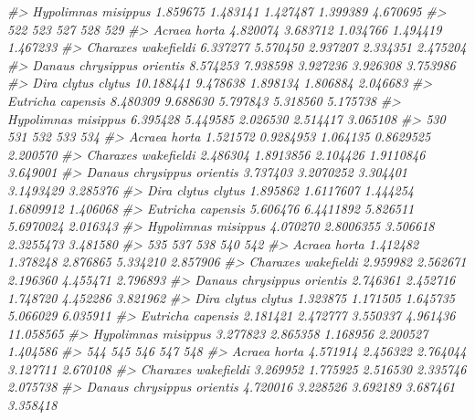 \documentclass[
]{article}
\newenvironment{Shaded}{\begin{snugshade}}{\end{snugshade}}
\newcommand{\CommentTok}[1]{\textcolor[rgb]{0.56,0.35,0.01}{\textit{#1}}}
\begin{document}
\begin{Shaded}
\begin{Highlighting}[]
\CommentTok{\#\textgreater{} Hypolimnas misippus        1.859675 1.483141 1.427487 1.399389 4.670695}
\CommentTok{\#\textgreater{}                                  522      523      527      528      529}
\CommentTok{\#\textgreater{} Acraea horta                4.820074 3.683712 1.034766 1.494419 1.467233}
\CommentTok{\#\textgreater{} Charaxes wakefieldi         6.337277 5.570450 2.937207 2.334351 2.475204}
\CommentTok{\#\textgreater{} Danaus chrysippus orientis  8.574253 7.938598 3.927236 3.926308 3.753986}
\CommentTok{\#\textgreater{} Dira clytus clytus         10.188441 9.478638 1.898134 1.806884 2.046683}
\CommentTok{\#\textgreater{} Eutricha capensis           8.480309 9.688630 5.797843 5.318560 5.175738}
\CommentTok{\#\textgreater{} Hypolimnas misippus         6.395428 5.449585 2.026530 2.514417 3.065108}
\CommentTok{\#\textgreater{}                                 530       531      532       533      534}
\CommentTok{\#\textgreater{} Acraea horta               1.521572 0.9284953 1.064135 0.8629525 2.200570}
\CommentTok{\#\textgreater{} Charaxes wakefieldi        2.486304 1.8913856 2.104426 1.9110846 3.649001}
\CommentTok{\#\textgreater{} Danaus chrysippus orientis 3.737403 3.2070252 3.304401 3.1493429 3.285376}
\CommentTok{\#\textgreater{} Dira clytus clytus         1.895862 1.6117607 1.444254 1.6809912 1.406068}
\CommentTok{\#\textgreater{} Eutricha capensis          5.606476 6.4411892 5.826511 5.6970024 2.016343}
\CommentTok{\#\textgreater{} Hypolimnas misippus        4.070270 2.8006355 3.506618 2.3255473 3.481580}
\CommentTok{\#\textgreater{}                                 535      537      538      540       542}
\CommentTok{\#\textgreater{} Acraea horta               1.412482 1.378248 2.876865 5.334210  2.857906}
\CommentTok{\#\textgreater{} Charaxes wakefieldi        2.959982 2.562671 2.196360 4.455471  2.796893}
\CommentTok{\#\textgreater{} Danaus chrysippus orientis 2.746361 2.452716 1.748720 4.452286  3.821962}
\CommentTok{\#\textgreater{} Dira clytus clytus         1.323875 1.171505 1.645735 5.066029  6.035911}
\CommentTok{\#\textgreater{} Eutricha capensis          2.181421 2.472777 3.550337 4.961436 11.058565}
\CommentTok{\#\textgreater{} Hypolimnas misippus        3.277823 2.865358 1.168956 2.200527  1.404586}
\CommentTok{\#\textgreater{}                                 544       545      546      547      548}
\CommentTok{\#\textgreater{} Acraea horta               4.571914  2.456322 2.764044 3.127711 2.670108}
\CommentTok{\#\textgreater{} Charaxes wakefieldi        3.269952  1.775925 2.516530 2.335746 2.075738}
\CommentTok{\#\textgreater{} Danaus chrysippus orientis 4.720016  3.228526 3.692189 3.687461 3.358418}

\end{Highlighting}
\end{Shaded}
\end{document}
